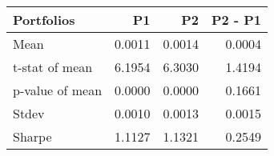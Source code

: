 \begin{tabular}{lrrr}
\toprule
Portfolios & P1 & P2 & P2 - P1 \\
\midrule
Mean & 0.0011 & 0.0014 & 0.0004 \\
t-stat of mean & 6.1954 & 6.3030 & 1.4194 \\
p-value of mean & 0.0000 & 0.0000 & 0.1661 \\
Stdev & 0.0010 & 0.0013 & 0.0015 \\
Sharpe & 1.1127 & 1.1321 & 0.2549 \\
\bottomrule
\end{tabular}
